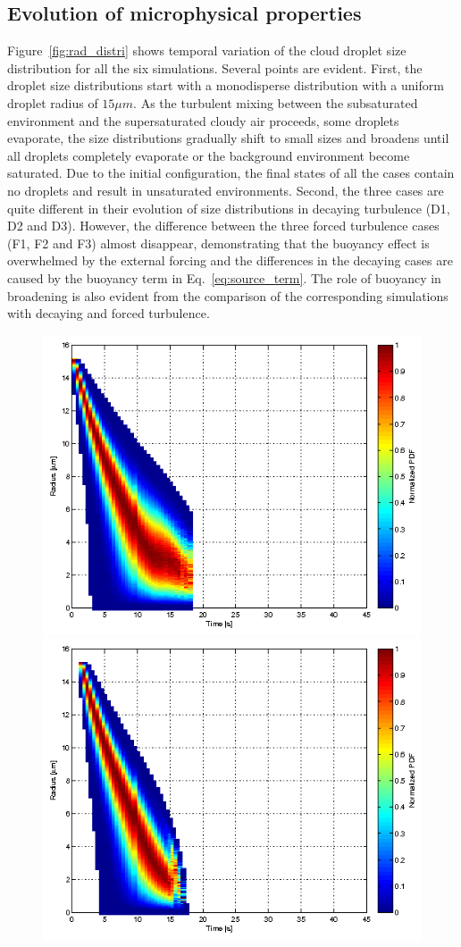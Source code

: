 \documentclass[draft,jgrga]{AGUTeX}
\newcommand{\Eq}[1]{Eq.~\eqref{#1}} \newcommand{\Fig}[1]{Figure~\ref{#1}}
\begin{document}
\begin{article}
\subsection{Evolution of microphysical properties}
\Fig{fig:rad_distri} shows temporal variation of the cloud droplet size distribution for all the six simulations. Several points are evident. First, the droplet size distributions start with a monodisperse distribution with a uniform droplet radius of $15\mu m$. As the turbulent mixing between the subsaturated environment and the supersaturated cloudy air proceeds, some droplets evaporate, the size distributions gradually shift to small sizes and broadens until all droplets completely evaporate or the background environment become saturated. Due to the initial configuration, the final states of all the cases contain no droplets and result in unsaturated environments. Second, the three cases are quite different in their evolution of size distributions in decaying turbulence (D1, D2 and D3). However, the difference between the three forced turbulence cases (F1, F2 and F3) almost disappear, demonstrating that the buoyancy effect is overwhelmed by the external forcing and the differences in the decaying cases are caused by the buoyancy term in \Eq{eq:source_term}. The role of buoyancy in broadening is also evident from the comparison of the corresponding simulations with decaying and forced turbulence.
\begin{figure}[!htbp]\centering
\includegraphics[width=0.48\linewidth]{Figures/pdf_radius_d1}
\includegraphics[width=0.48\linewidth]{Figures/pdf_radius_f1}\\

\end{figure}
\end{article}
\end{document}
